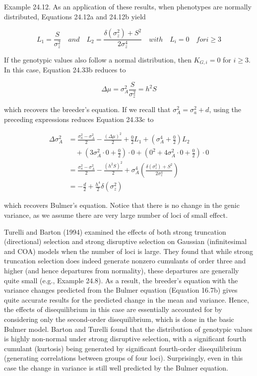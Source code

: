\documentclass{article}
\begin{document}
Example 24.12. As an application of these results, when phenotypes are normally distributed, Equations 24.12a and 24.12b yield

\begin{equation}
L_{1}=\frac{S}{\sigma_{z}^{2}}\quad and\quad L_{2}=\frac{\delta(\sigma_{z}^{2})+S^{2}}{2\sigma_{z}^{4}}\quad with\quad L_{i}=0\quad for i\geq3
\end{equation}

If the genotypic values also follow a normal distribution, then  $ K_{G,i} = 0 $ for  $ i \geq 3 $. In this case, Equation 24.33b reduces to

\begin{equation}
\Delta\mu=\sigma_{A}^{2}\frac{S}{\sigma_{z}^{2}}=h^{2}S
\end{equation}

which recovers the breeder's equation. If we recall that  $ \sigma_A^2 = \sigma_a^2 + d $, using the preceding expressions reduces Equation 24.33c to

\begin{equation}
\begin{aligned}\Delta\sigma_{A}^{2}&=\frac{\sigma_{a}^{2}-\sigma_{A}^{2}}{2}-\frac{(\Delta\mu)^{2}}{2}+\frac{0}{2}L_{1}+\left(\sigma_{A}^{4}+\frac{0}{2}\right)L_{2}\\&\quad+\left(3\sigma_{A}^{2}\cdot0+\frac{0}{2}\right)\cdot0+\left(0^{2}+4\sigma_{A}^{2}\cdot0+\frac{0}{2}\right)\cdot0\\&=\frac{\sigma_{a}^{2}-\sigma_{A}^{2}}{2}-\frac{(h^{2}S)^{2}}{2}+\sigma_{A}^{4}\left(\frac{\delta(\sigma_{z}^{2})+S^{2}}{2\sigma_{z}^{4}}\right)\\&=-\frac{d}{2}+\frac{h^{4}}{2}\delta(\sigma_{z}^{2})\end{aligned}
\end{equation}

which recovers Bulmer's equation. Notice that there is no change in the genic variance, as we assume there are very large number of loci of small effect.

Turelli and Barton (1994) examined the effects of both strong truncation (directional) selection and strong disruptive selection on Gaussian (infinitesimal and COA) models when the number of loci is large. They found that while strong truncation selection does indeed generate nonzero cumulants of order three and higher (and hence departures from normality), these departures are generally quite small (e.g., Example 24.8). As a result, the breeder's equation with the variance changes predicted from the Bulmer equation (Equation 16.7b) gives quite accurate results for the predicted change in the mean and variance. Hence, the effects of disequilibrium in this case are essentially accounted for by considering only the second-order disequilibrium, which is done in the basic Bulmer model. Barton and Turelli found that the distribution of genotypic values is highly non-normal under strong disruptive selection, with a significant fourth cumulant (kurtosis) being generated by significant fourth-order disequilibrium (generating correlations between groups of four loci). Surprisingly, even in this case the change in variance is still well predicted by the Bulmer equation.
\end{document}
